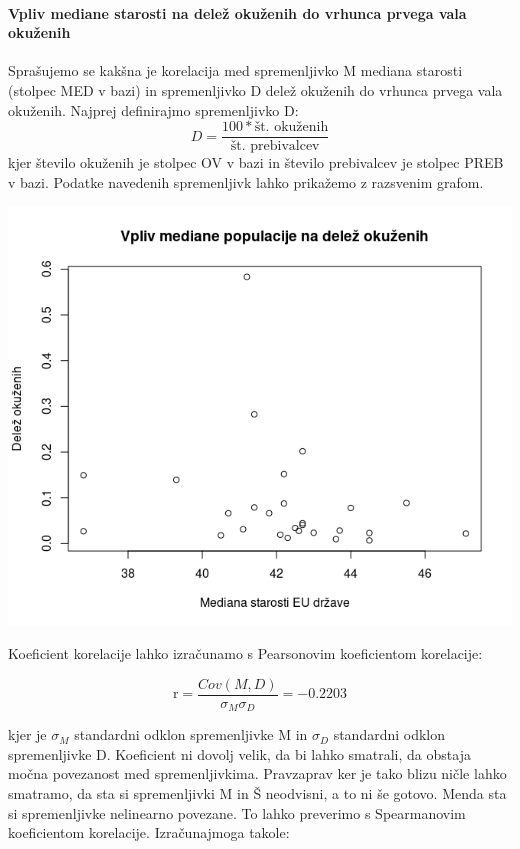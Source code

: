\documentclass[a4paper,11pt]{article}
\begin{document}
\paragraph{Vpliv mediane starosti na delež okuženih do vrhunca prvega vala okuženih}
Sprašujemo se kakšna je korelacija med spremenljivko M mediana starosti (stolpec MED v bazi) in spremenljivko D delež okuženih do vrhunca prvega vala okuženih. Najprej definirajmo spremenljivko D:
\[D = \frac{100 * \text{št. okuženih}}{\text{št. prebivalcev}}\]
kjer število okuženih je stolpec OV v bazi in število prebivalcev je stolpec PREB v bazi. Podatke navedenih spremenljivk lahko prikažemo z razsvenim grafom.
\\
\begin{center}
\includegraphics[scale=0.6]{vpliv_med_pop_na_delez_okuzencev}\\
\end{center}
Koeficient korelacije lahko izračunamo s Pearsonovim koeficientom korelacije:

\begin{center}
\[\text{r} = \frac{Cov(M,D)}{\sigma_{M} \sigma_{D}} = -0.2203\]
\end{center} 
kjer je \(\sigma_{M}\) standardni odklon spremenljivke M in \(\sigma_{D}\) standardni odklon spremenljivke D. Koeficient ni dovolj velik, da bi lahko smatrali, da obstaja močna povezanost med spremenljivkima. Pravzaprav ker je tako blizu ničle lahko smatramo, da sta si spremenljivki M in Š neodvisni, a to ni še gotovo. Menda sta si spremenljivke nelinearno povezane. To lahko preverimo s Spearmanovim koeficientom korelacije. Izračunajmoga takole: 
\end{document}
